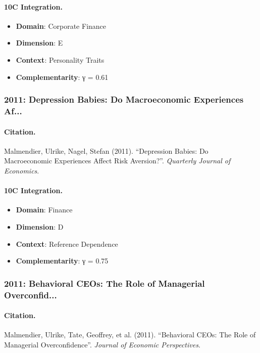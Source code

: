 \paragraph{10C Integration.}
\begin{itemize}[nosep]
  \item \textbf{Domain}: Corporate Finance
  \item \textbf{Dimension}: E
  \item \textbf{Context}: Personality Traits
  \item \textbf{Complementarity}: γ = 0.61
\end{itemize}


\subsubsection{2011: Depression Babies: Do Macroeconomic Experiences Af...}

\paragraph{Citation.}
Malmendier, Ulrike, Nagel, Stefan (2011). ``Depression Babies: Do Macroeconomic Experiences Affect Risk Aversion?''. \textit{Quarterly Journal of Economics}.

\paragraph{10C Integration.}
\begin{itemize}[nosep]
  \item \textbf{Domain}: Finance
  \item \textbf{Dimension}: D
  \item \textbf{Context}: Reference Dependence
  \item \textbf{Complementarity}: γ = 0.75
\end{itemize}


\subsubsection{2011: Behavioral CEOs: The Role of Managerial Overconfid...}

\paragraph{Citation.}
Malmendier, Ulrike, Tate, Geoffrey, et al. (2011). ``Behavioral CEOs: The Role of Managerial Overconfidence''. \textit{Journal of Economic Perspectives}.

